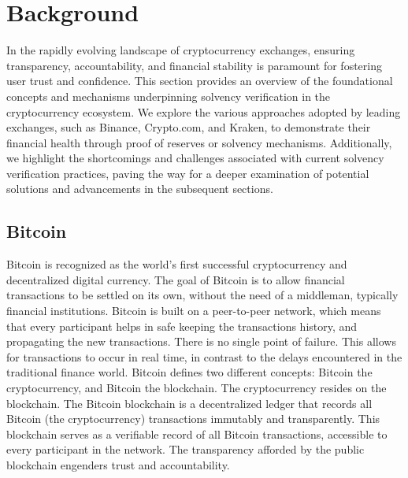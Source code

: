 
\chapter{Background}

In the rapidly evolving landscape of cryptocurrency exchanges, ensuring transparency, accountability, and financial stability
 is paramount for fostering user trust and confidence. This section provides an overview of the foundational concepts and mechanisms 
 underpinning solvency verification in the cryptocurrency ecosystem. We explore the various approaches adopted by leading exchanges, such as
  Binance, Crypto.com, and Kraken, to demonstrate their financial health through proof of reserves or solvency mechanisms. Additionally, we 
  highlight the shortcomings and challenges associated with current solvency verification practices, paving the way for a deeper examination
   of potential solutions and advancements in the subsequent sections.

\section{Bitcoin}

Bitcoin is recognized as the world's first successful cryptocurrency and decentralized digital currency. 
The goal of Bitcoin is to allow financial transactions to be settled on its own, without the need of a middleman, typically financial institutions.
Bitcoin is built on a peer-to-peer network, which means that every participant helps in safe keeping the transactions history, and propagating the new transactions.
There is no single point of failure. This allows for transactions to occur in real time, in contrast to the delays encountered in the traditional finance world.
Bitcoin defines two different concepts: Bitcoin the cryptocurrency, and Bitcoin the blockchain. The cryptocurrency resides on the blockchain.
The Bitcoin blockchain is a decentralized ledger that records all Bitcoin (the cryptocurrency) transactions immutably and transparently. 
This blockchain serves as a verifiable record of all Bitcoin transactions, accessible to every participant in the network. 
The transparency afforded by the public blockchain engenders trust and accountability.


